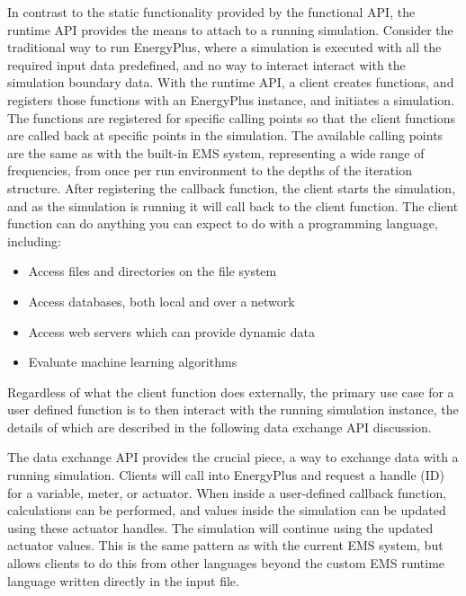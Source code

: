 \documentclass[5p, authoryear]{elsarticle}
\begin{document}
In contrast to the static functionality provided by the functional API, the runtime API provides the means to attach to a running simulation.
Consider the traditional way to run EnergyPlus, where a simulation is executed with all the required input data predefined, and no way to interact interact with the simulation boundary data.
With the runtime API, a client creates functions, and registers those functions with an EnergyPlus instance, and initiates a simulation.
The functions are registered for specific calling points so that the client functions are called back at specific points in the simulation.
The available calling points are the same as with the built-in EMS system, representing a wide range of frequencies, from once per run environment to the depths of the iteration structure.
After registering the callback function, the client starts the simulation, and as the simulation is running it will call back to the client function.
The client function can do anything you can expect to do with a programming language, including:
\begin{itemize}
 \item Access files and directories on the file system
 \item Access databases, both local and over a network
 \item Access web servers which can provide dynamic data
 \item Evaluate machine learning algorithms
\end{itemize}
Regardless of what the client function does externally, the primary use case for a user defined function is to then interact with the running simulation instance, the details of which are described in the following data exchange API discussion.

The data exchange API provides the crucial piece, a way to exchange data with a running simulation.  Clients will call into EnergyPlus and request a handle (ID) for a variable, meter, or actuator.  When inside a user-defined callback function, calculations can be performed, and values inside the simulation can be updated using these actuator handles.  The simulation will continue using the updated actuator values.  This is the same pattern as with the current EMS system, but allows clients to do this from other languages beyond the custom EMS runtime language written directly in the input file.
\end{document}

